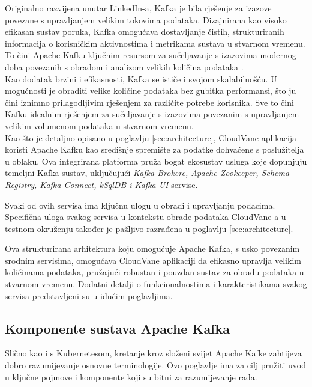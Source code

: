 \documentclass[times, utf8, diplomski]{fer}
\begin{document}
Originalno razvijena unutar LinkedIn-a, Kafka je bila rješenje za izazove povezane s upravljanjem velikim tokovima podataka. Dizajnirana kao visoko efikasan sustav poruka, Kafka omogućava dostavljanje čistih, strukturiranih informacija o korisničkim aktivnostima i metrikama sustava u stvarnom vremenu. To čini Apache Kafku ključnim resursom za sučeljavanje s izazovima modernog doba povezanih s obradom i analizom velikih količina podataka \citep{shapira_kafka_2021}.\\

Kao dodatak brzini i efikasnosti, Kafka se ističe i svojom skalabilnošću. U mogućnosti je obraditi velike količine podataka bez gubitka performansi, što ju čini iznimno prilagodljivim rješenjem za različite potrebe korisnika. Sve to čini Kafku idealnim rješenjem za sučeljavanje s izazovima povezanim s upravljanjem velikim volumenom podataka u stvarnom vremenu. \\

Kao što je detaljno opisano u poglavlju \ref{sec:architecture}, CloudVane aplikacija koristi Apache Kafku kao središnje spremište za podatke dohvaćene s poslužitelja u oblaku. Ova integrirana platforma pruža bogat ekosustav usluga koje dopunjuju temeljni Kafka sustav, uključujući \emph{Kafka Brokere, Apache Zookeeper, Schema Registry, Kafka Connect, kSqlDB i Kafka UI} servise.

Svaki od ovih servisa ima ključnu ulogu u obradi i upravljanju podacima. Specifična uloga svakog servisa u kontekstu obrade podataka CloudVane-a u testnom okruženju također je pažljivo razrađena u poglavlju \ref{sec:architecture}.

Ova strukturirana arhitektura koju omogućuje Apache Kafka, s usko povezanim srodnim servisima, omogućava CloudVane aplikaciji da efikasno upravlja velikim količinama podataka, pružajući robustan i pouzdan sustav za obradu podataka u stvarnom vremenu.
Dodatni detalji o funkcionalnostima i karakteristikama svakog servisa predstavljeni su u idućim poglavljima.\\

\subsection{Komponente sustava Apache Kafka}

Slično kao i s Kubernetesom, kretanje kroz složeni svijet Apache Kafke zahtijeva dobro razumijevanje osnovne terminologije. Ovo poglavlje ima za cilj pružiti uvod u ključne pojmove i komponente koji su bitni za razumijevanje rada.\\
\end{document}
